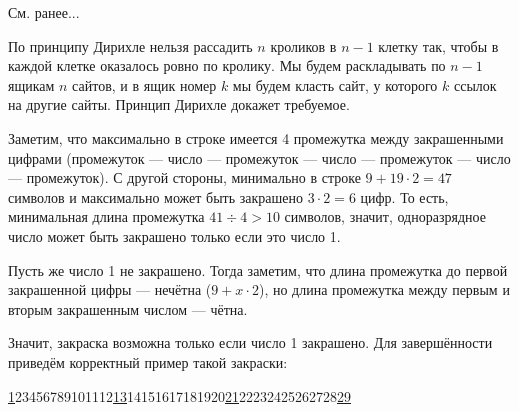 
\begin{itemize}
\itA См. ранее...

\itB По принципу Дирихле нельзя рассадить $n$ кроликов в $n-1$ клетку так, 
чтобы в каждой клетке оказалось ровно по кролику.
Мы будем раскладывать по $n-1$ ящикам $n$ сайтов, и в ящик номер $k$ мы будем класть
сайт, у которого $k$ ссылок на другие сайты. Принцип Дирихле докажет требуемое.

\itC Заметим, что максимально в строке имеется 4 промежутка между закрашенными цифрами
(промежуток --- число --- промежуток --- число --- промежуток --- число --- промежуток).
С другой стороны, минимально в строке $9 + 19\cdot 2 = 47$ символов и максимально может 
быть закрашено $3 \cdot 2 = 6$ цифр.
То есть, минимальная длина промежутка $41 \div 4 > 10$ символов, значит, одноразрядное
число может быть закрашено только если это число 1.

Пусть же число 1 не закрашено. Тогда заметим, что длина
промежутка до первой закрашенной цифры --- нечётна ($9 + x \cdot 2$), но длина промежутка
между первым и вторым закрашенным числом --- чётна.

Значит, закраска возможна только если число 1 закрашено.
Для завершённости приведём корректный пример такой закраски:

\begin{center}
{\underline{1}}23456789101112{\underline{13}}14151617181920{\underline{21}}22232425262728{\underline{29}}
\end{center}

\end{itemize}